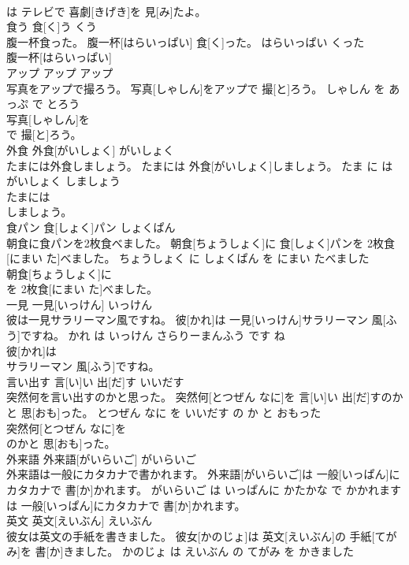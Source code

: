 \documentclass[8pt]{extreport}
\begin{document}
\begin{CJK}{UTF8}{min}
\\	は テレビで 喜劇[きげき]を 見[み]たよ。			
\\	食う	食[く]う	くう	
\\	腹一杯食った。	腹一杯[はらいっぱい] 食[く]った。	はらいっぱい くった	
\\	腹一杯[はらいっぱい]
\\	アップ	アップ	アップ	
\\	写真をアップで撮ろう。	写真[しゃしん]をアップで 撮[と]ろう。	しゃしん を あっぷ で とろう	
\\	写真[しゃしん]を
\\	で 撮[と]ろう。			
\\	外食	外食[がいしょく]	がいしょく	
\\	たまには外食しましょう。	たまには 外食[がいしょく]しましょう。	たま に は がいしょく しましょう	
\\	たまには
\\	しましょう。			
\\	食パン	食[しょく]パン	しょくぱん	
\\	朝食に食パンを2枚食べました。	朝食[ちょうしょく]に 食[しょく]パンを 2枚食[にまい た]べました。	ちょうしょく に しょくぱん を にまい たべました	
\\	朝食[ちょうしょく]に
\\	を 2枚食[にまい た]べました。			
\\	一見	一見[いっけん]	いっけん	
\\	彼は一見サラリーマン風ですね。	彼[かれ]は 一見[いっけん]サラリーマン 風[ふう]ですね。	かれ は いっけん さらりーまんふう です ね	
\\	彼[かれ]は
\\	サラリーマン 風[ふう]ですね。			
\\	言い出す	言[い]い 出[だ]す	いいだす	
\\	突然何を言い出すのかと思った。	突然何[とつぜん なに]を 言[い]い 出[だ]すのかと 思[おも]った。	とつぜん なに を いいだす の か と おもった	
\\	突然何[とつぜん なに]を
\\	のかと 思[おも]った。			
\\	外来語	外来語[がいらいご]	がいらいご	
\\	外来語は一般にカタカナで書かれます。	外来語[がいらいご]は 一般[いっぱん]にカタカナで 書[か]かれます。	がいらいご は いっぱんに かたかな で かかれます	
\\	は 一般[いっぱん]にカタカナで 書[か]かれます。			
\\	英文	英文[えいぶん]	えいぶん	
\\	彼女は英文の手紙を書きました。	彼女[かのじょ]は 英文[えいぶん]の 手紙[てがみ]を 書[か]きました。	かのじょ は えいぶん の てがみ を かきました	

\end{CJK}
\end{document}

